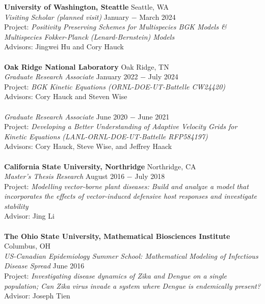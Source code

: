 \documentclass{article}
\begin{document}
\noindent \textbf{University of Washington, Steattle}
  \hfill Seattle, WA
\\
\textit{Visiting Scholar (planned visit)}
  \hfill January $-$ March 2024
\\
Project: \textit{Positivity Preserving Schemes for Multispecies BGK Models \& Multispecies Fokker-Planck (Lenard-Bernstein) Models}
\\
  Advisors: Jingwei Hu and Cory Hauck
\\
\\
\noindent \textbf{Oak Ridge National Laboratory}
  \hfill Oak Ridge, TN
\\
\textit{Graduate Research Associate}
  \hfill January 2022 $-$ July 2024
\\
Project: \textit{BGK Kinetic Equations (ORNL-DOE-UT-Battelle CW24420)}
\\
  Advisors: Cory Hauck and Steven Wise
\\
\\
\textit{Graduate Research Associate}
  \hfill June 2020 $-$ June 2021
\\
Project: \textit{Developing a Better Understanding of
Adaptive Velocity Grids for Kinetic Equations (LANL-ORNL-DOE-UT-Battelle RFP584197)}
\\
Advisors: Cory Hauck, Steve Wise, and Jeffrey Haack
\\
\\
\textbf{California State University, Northridge}
  \hfill Northridge, CA
\\
\textit{Master's Thesis Research}
  \hfill August 2016 $-$ July 2018
\\
Project: \textit{Modelling vector-borne plant diseases: Build and analyze a model that incorporates the effects of vector-induced defensive host responses and investigate stability}
\\
Advisor: Jing Li
\\
\\
\textbf{The Ohio State University, Mathematical Biosciences Institute}
  \hfill Columbus, OH
\\
\textit{US-Canadian Epidemiology Summer School: Mathematical Modeling of Infectious Disease Spread} 
  \hfill June 2016
\\
Project: \textit{Investigating disease dynamics of Zika and Dengue on a single population; Can Zika virus invade a system where Dengue is endemically present?}
\\
Advisor: Joseph Tien
\end{document}
